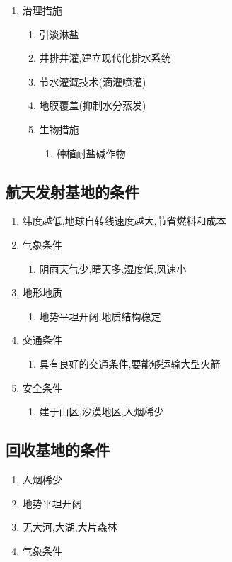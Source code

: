 \documentclass[a4paper]{article}
\begin{document}
\begin{enumerate}
        \item 治理措施
        \begin{enumerate}
            \item 引淡淋盐
            \item 井排井灌,建立现代化排水系统
            \item 节水灌溉技术(滴灌喷灌)
            \item 地膜覆盖(抑制水分蒸发)
            \item 生物措施
            \begin{enumerate}
                \item 种植耐盐碱作物
            \end{enumerate}
        \end{enumerate}
    \end{enumerate}
    \subsection{航天发射基地的条件}
    \begin{enumerate}
        \item 纬度越低,地球自转线速度越大,节省燃料和成本
        \item 气象条件
        \begin{enumerate}
            \item 阴雨天气少,晴天多,湿度低,风速小
        \end{enumerate}
        \item 地形地质
        \begin{enumerate}
            \item 地势平坦开阔,地质结构稳定
        \end{enumerate}
        \item 交通条件
        \begin{enumerate}
            \item 具有良好的交通条件,要能够运输大型火箭
        \end{enumerate}
        \item 安全条件
        \begin{enumerate}
            \item 建于山区,沙漠地区,人烟稀少
        \end{enumerate}
    \end{enumerate}
    \subsection{回收基地的条件}
    \begin{enumerate}
        \item 人烟稀少
        \item 地势平坦开阔
        \item 无大河,大湖,大片森林
        \item 气象条件
    \end{enumerate}
\end{document}
